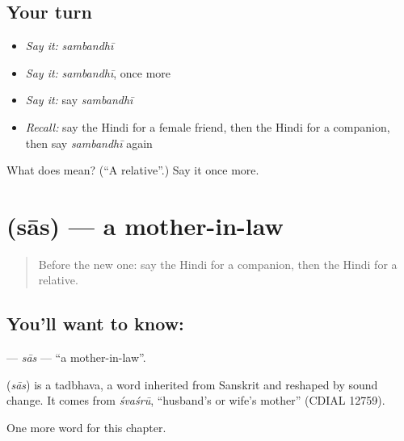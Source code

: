 \subsection*{Your turn}
\begin{itemize}
\raggedright
  \item \emph{Say it:} \emph{sambandhī}
  \item \emph{Say it:} \emph{sambandhī}, once more
  \item \emph{Say it:} say \emph{sambandhī}
  \item \emph{Recall:} say the Hindi for a female friend, then the Hindi for a companion, then say \emph{sambandhī} again
\end{itemize}

\begin{tcolorbox}[breakable,colback=teal!4,colframe=teal!35!black,title={Before you move on}]
What does  mean? (\textquotedblleft{}A relative\textquotedblright{}.) Say it once more.
\end{tcolorbox}
\section[\texorpdfstring{\hi{सास} (sās)}{सास (sās)}]{ (sās) — a mother-in-law}

\label{lesson:HI-C254-sas}



\begin{quote}
Before the new one: say the Hindi for a companion, then the Hindi for a relative.
\end{quote}

\subsection*{You'll want to know: }
\textbf{} — \emph{sās} — \textquotedblleft{}a mother-in-law\textquotedblright{}.

\begin{cousinweb}
\textbf{} (\emph{sās}) is a tadbhava, a word inherited from Sanskrit and reshaped by sound change. It comes from \emph{śvaśrū}, \textquotedblleft{}husband's or wife's mother\textquotedblright{} (CDIAL 12759).
\end{cousinweb}

\begin{grammarlens}[title={What you've built}]
One more word for this chapter.
\end{grammarlens}

